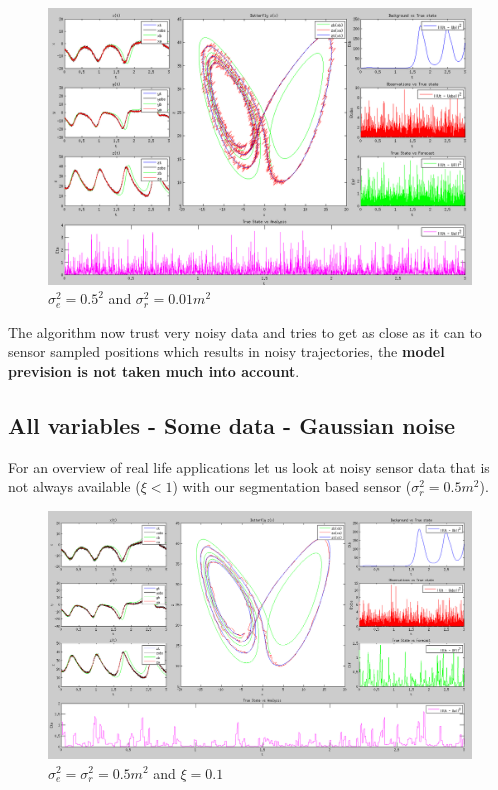 \documentclass[11pt,a4paper]{article}
\begin{document}
\vskip 0.5cm
\begin{figure}[H]
   \includegraphics[width=16cm]{Q11c.png}
   \caption{$\sigma_e^2 = 0.5^2$ and $\sigma_r^2 = 0.01m^2$}
\end{figure}
\vskip 0.5cm

The algorithm now trust very noisy data and tries to get as close as it can to sensor sampled positions which results in noisy trajectories, the \textbf{model prevision is not taken much into account}.

\clearpage
\subsection{All variables - Some data - Gaussian noise}

For an overview of real life applications let us look at noisy sensor data that is not always available ($\xi < 1$) with our segmentation based sensor ($\sigma_r^2 = 0.5m^2$).

\begin{figure}[H]
    \centering
   \includegraphics[width=14cm]{Q12a.png}
   \caption{$\sigma_e^2 = \sigma_r^2 = 0.5m^2$ and $\xi = 0.1$}
\end{figure}
\end{document}
